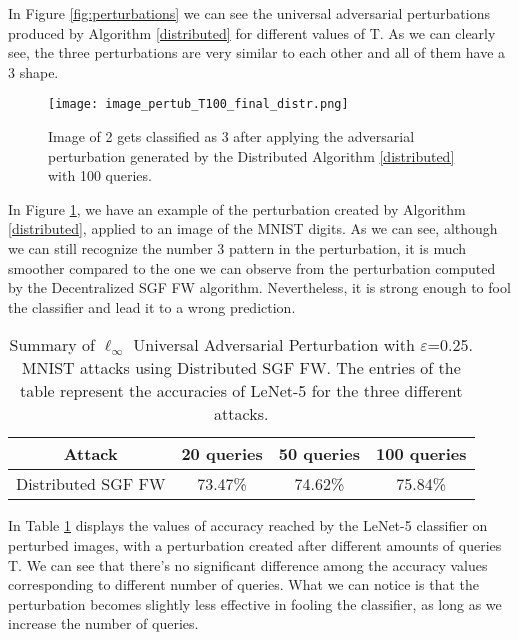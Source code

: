 In Figure \ref{fig:perturbations} we can see the universal adversarial perturbations produced by Algorithm \ref{distributed}
for different values of T. As we can clearly see, the three perturbations are very similar to each other and all of
them have a 3 shape.

\begin{figure}[htbp]
	\centering
	\texttt{[image: image\_pertub\_T100\_final\_distr.png]}
	\caption{{\small Image of 2 gets classified as 3 after applying the adversarial perturbation generated by the Distributed
	Algorithm \ref{distributed} with 100 queries.}}
	\label{fig:distributed}
\end{figure}

In Figure \ref{fig:distributed}, we have an example of the perturbation created by Algorithm \ref{distributed},
applied to an image of the MNIST digits. As we can see, although we can still recognize the number 3 pattern in the
perturbation, it is much smoother compared to the one we can observe from the perturbation computed by the Decentralized
SGF FW algorithm. Nevertheless, it is strong enough to fool the classifier and lead it to a wrong prediction.

\begin{table}[htbp]
	\begin{center}
		\begin{adjustwidth}{-.6cm}{}
			\begin{tabular}{c|ccc}
				\textbf{Attack} &          20 \textbf{queries} &      50 \textbf{queries} &     100 \textbf{queries} \\
				\midrule
				{\small Distributed SGF FW}     &   73.47\% &    74.62\% &       75.84\% \\
			\end{tabular}
		\end{adjustwidth}
	\end{center}
	\caption{{\small Summary of $\ell_\infty$ Universal Adversarial Perturbation with $\varepsilon$=0.25. MNIST attacks using Distributed SGF FW. The entries of the table represent the accuracies of LeNet-5 for the three different attacks.}}
	\label{tab:distributed}
\end{table}

In Table \ref{tab:distributed} displays the values of accuracy reached by the LeNet-5 classifier on perturbed
images, with a perturbation created after different amounts of queries T. We can see that there's no significant
difference among the accuracy values corresponding to different number of queries. What we can notice is that the
perturbation becomes slightly less effective in fooling the classifier, as long as we increase the number of queries.